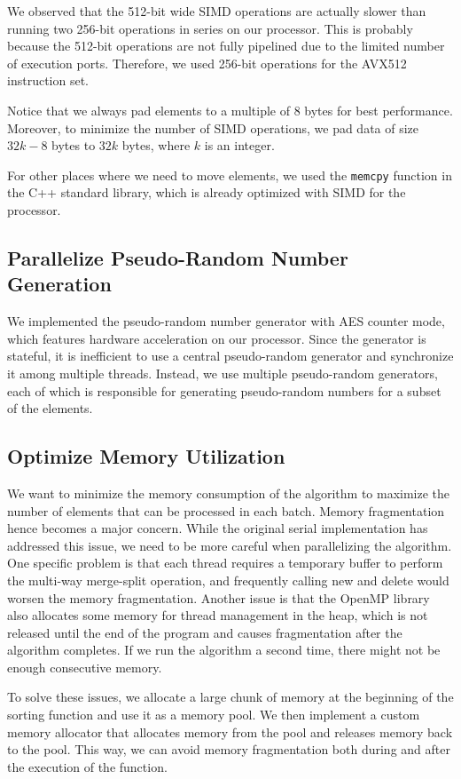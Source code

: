 \documentclass{article}
\begin{document}
We observed that the 512-bit wide SIMD operations are actually slower than running two 256-bit operations in series on our processor. This is probably because the 512-bit operations are not fully pipelined due to the limited number of execution ports. Therefore, we used 256-bit operations for the AVX512 instruction set.

Notice that we always pad elements to a multiple of 8 bytes for best performance. Moreover, to minimize the number of SIMD operations, we pad data of size $32k - 8$ bytes to $32k$ bytes, where $k$ is an integer. 

For other places where we need to move elements, we used the {\tt memcpy} function in the C++ standard library, which is already optimized with SIMD for the processor.
\subsection{Parallelize Pseudo-Random Number Generation}
We implemented the pseudo-random number generator with AES counter mode, which features hardware acceleration on our processor. Since the generator is stateful, it is inefficient to use a central pseudo-random generator and synchronize it among multiple threads. Instead, we use multiple pseudo-random generators, each of which is responsible for generating pseudo-random numbers for a subset of the elements.

\subsection{Optimize Memory Utilization}
We want to minimize the memory consumption of the algorithm to maximize the number of elements that can be processed in each batch. Memory fragmentation hence becomes a major concern. While the original serial implementation has addressed this issue, we need to be more careful when parallelizing the algorithm. One specific problem is that each thread requires a temporary buffer to perform the multi-way merge-split operation, and frequently calling new and delete would worsen the memory fragmentation. Another issue is that the OpenMP library also allocates some memory for thread management in the heap, which is not released until the end of the program and causes fragmentation after the algorithm completes. If we run the algorithm a second time, there might not be enough consecutive memory.

To solve these issues, we allocate a large chunk of memory at the beginning of the sorting function and use it as a memory pool. We then implement a custom memory allocator that allocates memory from the pool and releases memory back to the pool. This way, we can avoid memory fragmentation both during and after the execution of the function.
\end{document}
